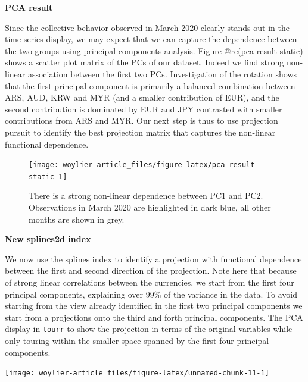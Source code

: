 \textbf{PCA result}

Since the collective behavior observed in March 2020 clearly stands out
in the time series display, we may expect that we can capture the
dependence between the two groups using principal components analysis.
Figure @re(pca-result-static) shows a scatter plot matrix of the PCs of
our dataset. Indeed we find strong non-linear association between the
first two PCs. Investigation of the rotation shows that the first
principal component is primarily a balanced combination between ARS,
AUD, KRW and MYR (and a smaller contribution of EUR), and the second
contribution is dominated by EUR and JPY contrasted with smaller
contributions from ARS and MYR. Our next step is thus to use projection
pursuit to identify the best projection matrix that captures the
non-linear functional dependence.

\begin{Schunk}
\begin{figure}

{\centering \texttt{[image: woylier-article\_files/figure-latex/pca-result-static-1]} 

}

\caption[There is a strong non-linear dependence between PC1 and PC2]{There is a strong non-linear dependence between PC1 and PC2. Observations in March 2020 are highlighted in dark blue, all other months are shown in grey.}\label{fig:pca-result-static}
\end{figure}
\end{Schunk}

\textbf{New splines2d index}

We now use the splines index to identify a projection with functional
dependence between the first and second direction of the projection.
Note here that because of strong linear correlations between the
currencies, we start from the first four principal components,
explaining over 99\% of the variance in the data. To avoid starting from
the view already identified in the first two principal components we
start from a projections onto the third and forth principal components.
The PCA display in \texttt{tourr} to show the projection in terms of the
original variables while only touring within the smaller space spanned
by the first four principal components.

\begin{Schunk}

\texttt{[image: woylier-article\_files/figure-latex/unnamed-chunk-11-1]} \end{Schunk}

